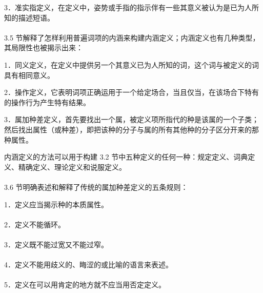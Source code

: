 3．准实指定义，在定义中，姿势或手指的指示伴有一些其意义被认为是已为人所知的描述短语。\\\\
3.5 节解释了怎样利用普遍词项的内涵来构建内涵定义；内涵定义也有几种类型，其局限性也被揭示出来：

1．同义定义，在定义中提供另一个其意义已为人所知的词，这个词与被定义的词具有相同意义。

2．操作定义，它表明词项正确运用于一个给定场合，当且仅当，在该场合下特有的操作行为产生特有结果。

3．属加种差定义，首先要找出一个属，被定义项所指代的种是该属的一个子类；然后找出属性（或种差），即把该种的分子与属的所有其他种的分子区分开来的那种属性。

内涵定义的方法可以用于构建 3.2 节中五种定义的任何一种：规定定义、词典定义、精确定义、理论定义和说服定义。\\\\
3.6 节明确表述和解释了传统的属加种差定义的五条规则：

1．定义应当揭示种的本质属性。\\\\
2．定义不能循环。\\\\
3．定义既不能过宽又不能过窄。\\\\
4．定义不能用歧义的、䀲涩的或比喻的语言来表述。\\\\
5．定义在可以用肯定的地方就不应当用否定定义。
